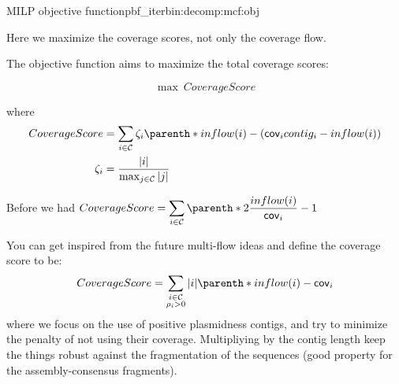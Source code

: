 \begin{definition}{\MCF{} MILP objective function}{pbf_iterbin:decomp:mcf:obj}
  \begin{newfeatbox}
    Here we maximize the coverage scores, not only the coverage flow.
  \end{newfeatbox}
  The objective function aims to maximize the total coverage scores:
  \begin{Objective}
    \begin{equation}
      \max ~ CoverageScore
      \label{pbf_iterbin:decomp:mcf:obj:max_coverage_score} %
    \end{equation}
  \end{Objective}
  where
  \begin{align*}
    CoverageScore & = \sum_{i \in \Contigs{}} \fzeta{i} \parenth*{ inflow(i) - (\cov{i}\contig{i} - inflow(i)) } \\
    \fzeta{i} & = \frac{ |i| }{ \max_{j \in \Contigs{}} |j| }
  \end{align*}

  \begin{notebox}
    Before we had \(
      \displaystyle CoverageScore = %
      \sum_{i \in \Contigs{}} \parenth*{2 \frac{inflow(i)}{\cov{i}} - 1}
    \)
  \end{notebox}

  \begin{ideabox}
    You can get inspired from the future multi-flow ideas and define the coverage score to be:
    \[
      CoverageScore = \sum_{
        \substack{
          i \in \Contigs{} \\
          \plm{i} > 0
        }
      } |i| \parenth*{ inflow(i) - \cov{i} }
    \]
    where we focus on the use of positive plasmidness contigs, and try to minimize the penalty of not using their coverage.
    Multipliying by the contig length keep the things robust against the fragmentation of the sequences (good property for the assembly-consensus fragments).
  \end{ideabox}
\end{definition}
